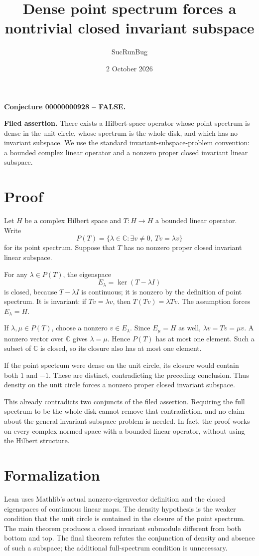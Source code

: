 \documentclass[11pt]{article}
\title{Dense point spectrum forces a nontrivial closed invariant subspace}
\author{SucRunBug}
\date{2 October 2026}
\begin{document}
\maketitle
\textbf{Conjecture 00000000928 -- FALSE.}

\textbf{Filed assertion.} There exists a Hilbert-space operator whose point spectrum is dense in the unit circle, whose spectrum is the whole disk, and which has no invariant subspace. We use the standard invariant-subspace-problem convention: a bounded complex linear operator and a nonzero proper closed invariant linear subspace.

\section*{Proof}
Let $H$ be a complex Hilbert space and $T:H\to H$ a bounded linear operator. Write
\[P(T)=\{\lambda\in\mathbb C:\exists v\ne0,\ Tv=\lambda v\}\]
for its point spectrum. Suppose that $T$ has no nonzero proper closed invariant linear subspace.

For any $\lambda\in P(T)$, the eigenspace
\[E_\lambda=\ker(T-\lambda I)\]
is closed, because $T-\lambda I$ is continuous; it is nonzero by the definition of point spectrum. It is invariant: if $Tv=\lambda v$, then $T(Tv)=\lambda Tv$. The assumption forces $E_\lambda=H$.

If $\lambda,\mu\in P(T)$, choose a nonzero $v\in E_\lambda$. Since $E_\mu=H$ as well, $\lambda v=Tv=\mu v$. A nonzero vector over $\mathbb C$ gives $\lambda=\mu$. Hence $P(T)$ has at most one element. Such a subset of $\mathbb C$ is closed, so its closure also has at most one element.

If the point spectrum were dense on the unit circle, its closure would contain both $1$ and $-1$. These are distinct, contradicting the preceding conclusion. Thus density on the unit circle forces a nonzero proper closed invariant subspace.

This already contradicts two conjuncts of the filed assertion. Requiring the full spectrum to be the whole disk cannot remove that contradiction, and no claim about the general invariant subspace problem is needed. In fact, the proof works on every complex normed space with a bounded linear operator, without using the Hilbert structure.

\section*{Formalization}
Lean uses Mathlib's actual nonzero-eigenvector definition and the closed eigenspaces of continuous linear maps. The density hypothesis is the weaker condition that the unit circle is contained in the closure of the point spectrum. The main theorem produces a closed invariant submodule different from both bottom and top. The final theorem refutes the conjunction of density and absence of such a subspace; the additional full-spectrum condition is unnecessary.
\end{document}
